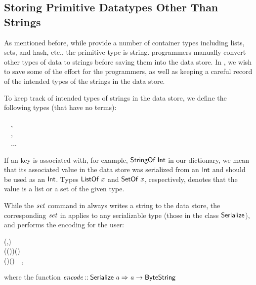 \subsection{Storing Primitive Datatypes Other Than Strings}
\label{sec:polymorphic-redis}

As mentioned before, while \Redis{} provide a number of container types
including lists, sets, and hash, etc., the primitive type is string.
\Hedis{} programmers manually convert other types of data to strings before
saving them into the data store. In \Edis{}, we wish to save some of the
effort for the programmers, as well as keeping a careful record of the intended
types of the strings in the data store.

To keep track of intended types of strings in the data store, we define the
following types (that have no terms):
\begin{hscode}\SaveRestoreHook
{}%
%
\>[B]{}\;\;~~,{}\<[E]%
\\
\>[B]{}\;\;~~,{}\<[E]%
\\
\>[B]{}\;\;~~...{}\<[E]%
\ColumnHook
\end{hscode}\resethooks
If an key is associated with, for example, \ensuremath{\Conid{StringOf}\;\Conid{Int}} in
our dictionary, we mean that its associated value in the data store was
serialized from an \ensuremath{\Conid{Int}} and should be used as an \ensuremath{\Conid{Int}}. Types
\ensuremath{\Conid{ListOf}\;\Varid{x}} and \ensuremath{\Conid{SetOf}\;\Varid{x}}, respectively, denotes that the value is a list
or a set of the given type.

While the \ensuremath{\Varid{set}} command in \Hedis{} always writes a string to the data store,
the corresponding \ensuremath{\Varid{set}} in \Redis{} applies to any serializable type (those
in the class \ensuremath{\Conid{Serialize}}), and performs the encoding for the user:
\begin{hscode}\SaveRestoreHook
{}%
%
%
\>[B]{}\<[6]%
\>[6]{}\mathbin{::}(\;,\;){}\<[E]%
\\
\>[6]{}\Rightarrow {}\;\to {}\to {}\;\;(\;\;\;(\;))\;(\;\;){}\<[E]%
\\
\>[B]{}\;\;\mathrel{=}\mathbin{\$}\;(\;)\;(\;)~~,{}\<[E]%
\ColumnHook
\end{hscode}\resethooks
where the function \ensuremath{\Varid{encode}\mathbin{::}\Conid{Serialize}\;\Varid{a}\Rightarrow \Varid{a}\to \Conid{ByteString}}

